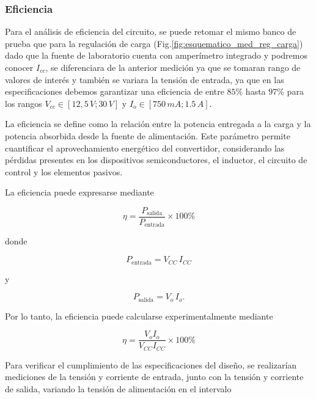 \documentclass[]{article}
\begin{document}
	\subsubsection{Eficiencia}
	
	Para el análisis de eficiencia del circuito, se puede retomar el mismo banco de prueba que para la regulación de carga (Fig.\ref{fig:esquematico_med_reg_carga}) dado que la fuente de laboratorio cuenta con amperímetro integrado y podremos conocer $I_{cc}$, se diferenciara de la anterior medición ya que se tomaran rango de valores de interés y también se variara la tensión de entrada, ya que en las especificaciones debemos garantizar una eficiencia de entre $85 \%$ hasta $97 \%$ para los rangos $V_{cc} \in [12,5 \, V ; 30 \, V]$ y $ I_o \in [750 \, mA ; 1.5 \,A]$.
	
	
	La eficiencia se define como la relación entre la potencia entregada a la carga y la potencia absorbida desde la fuente de alimentación. Este parámetro permite cuantificar el aprovechamiento energético del convertidor, considerando las pérdidas presentes en los dispositivos semiconductores, el inductor, el circuito de control y los elementos pasivos.
	
	La eficiencia puede expresarse mediante
	
	\begin{equation}
		\eta=
		\frac{P_{\mathrm{salida}}}
		{P_{\mathrm{entrada}}}
		\times100 \%
	\end{equation}
	
	donde
	
	\begin{equation}
		P_{\mathrm{entrada}}=V_{CC}\,I_{CC}
	\end{equation}
	
	y
	
	\begin{equation}
		P_{\mathrm{salida}}=V_{o}\,I_{o}.
	\end{equation}
	
	Por lo tanto, la eficiencia puede calcularse experimentalmente mediante
	
	\begin{equation}
		\eta=
		\frac{V_o I_o}
		{V_{CC} I_{CC}}
		\times100 \%
	\end{equation}
	
	Para verificar el cumplimiento de las especificaciones del diseño, se realizarían mediciones de la tensión y corriente de entrada, junto con la tensión y corriente de salida, variando la tensión de alimentación en el intervalo
	
\end{document}

